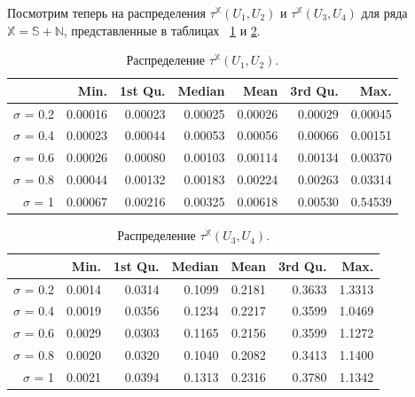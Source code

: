 \documentclass[specialist,
               substylefile = spbu.rtx,
               subf,href,colorlinks=true, 12pt]{disser}
\begin{document}
Посмотрим теперь на распределения  $\tau^{\mathbb{X}}(U_1, U_2)$ и  $\tau^{\mathbb{X}}(U_3, U_4)$ для ряда $\mathbb{X} = \mathbb{S} + \mathbb{N}$, представленные в таблицах ~\ref{tab:model_dist_tau1_sig_noise_notint} и \ref{tab:model_dist_tau1_sig_noise_notint2}.

\begin{table}[hhh!]
\caption{Распределение $\tau^{\mathbb{X}}(U_1, U_2)$.}
\centering
\begin{tabular}{rrrrrrr}
  \hline
 & Min. & 1st Qu. & Median & Mean & 3rd Qu. & Max. \\ 
  \hline
$\sigma$ = 0.2 & 0.00016 & 0.00023 & 0.00025 & 0.00026 & 0.00029 & 0.00045 \\ 
  $\sigma$ = 0.4 & 0.00023 & 0.00044 & 0.00053 & 0.00056 & 0.00066 & 0.00151 \\ 
  $\sigma$ = 0.6 & 0.00026 & 0.00080 & 0.00103 & 0.00114 & 0.00134 & 0.00370 \\ 
  $\sigma$ = 0.8 & 0.00044 & 0.00132 & 0.00183 & 0.00224 & 0.00263 & 0.03314 \\ 
  $\sigma$ = 1 & 0.00067 & 0.00216 & 0.00325 & 0.00618 & 0.00530 & 0.54539 \\ 
   \hline
\end{tabular}
\label{tab:model_dist_tau1_sig_noise_notint}
\end{table}

\begin{table}[hhh!]
\caption{Распределение $\tau^{\mathbb{X}}(U_3, U_4)$.}
\centering
\begin{tabular}{rrrrrrr}
  \hline
 & Min. & 1st Qu. & Median & Mean & 3rd Qu. & Max. \\ 
  \hline
$\sigma$ = 0.2 & 0.0014 & 0.0314 & 0.1099 & 0.2181 & 0.3633 & 1.3313 \\ 
  $\sigma$ = 0.4 & 0.0019 & 0.0356 & 0.1234 & 0.2217 & 0.3599 & 1.0469 \\ 
  $\sigma$ = 0.6 & 0.0029 & 0.0303 & 0.1165 & 0.2156 & 0.3599 & 1.1272 \\ 
  $\sigma$ = 0.8 & 0.0020 & 0.0320 & 0.1040 & 0.2082 & 0.3413 & 1.1400 \\ 
  $\sigma$ = 1 & 0.0021 & 0.0394 & 0.1313 & 0.2316 & 0.3780 & 1.1342 \\ 
   \hline
\end{tabular}
\label{tab:model_dist_tau1_sig_noise_notint2}
\end{table}
\end{document}
